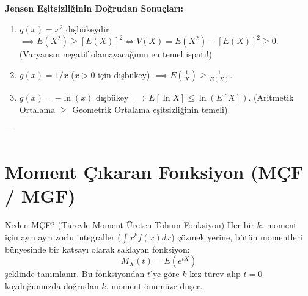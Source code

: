\documentclass[12pt,a4paper]{article}
\begin{document}
\begin{center}
\end{center}

\textbf{Jensen Eşitsizliğinin Doğrudan Sonuçları:}
\begin{enumerate}
    \item $g(x) = x^2$ dışbükeydir $\implies E(X^2) \ge [E(X)]^2 \iff V(X) = E(X^2) - [E(X)]^2 \ge 0$. (Varyansın negatif olamayacağının en temel ispatı!)
    \item $g(x) = 1/x$ ($x > 0$ için dışbükey) $\implies E\left(\frac{1}{X}\right) \ge \frac{1}{E(X)}$.
    \item $g(x) = -\ln(x)$ dışbükey $\implies E[\ln X] \le \ln(E[X])$. (Aritmetik Ortalama $\ge$ Geometrik Ortalama eşitsizliğinin temeli).
\end{enumerate}

---

\section{Moment Çıkaran Fonksiyon (MÇF / MGF)}

\begin{sezgi}{Neden MÇF? (Türevle Moment Üreten Tohum Fonksiyon)}
Her bir $k$. moment için ayrı ayrı zorlu integraller ($\int x^k f(x) dx$) çözmek yerine, bütün momentleri bünyesinde bir katsayı olarak saklayan fonksiyon:
\begin{equation}
    M_X(t) = E(e^{tX})
\end{equation}
şeklinde tanımlanır. Bu fonksiyondan $t$'ye göre $k$ kez türev alıp $t=0$ koyduğumuzda doğrudan $k$. moment önümüze düşer.
\end{sezgi}
\end{document}
